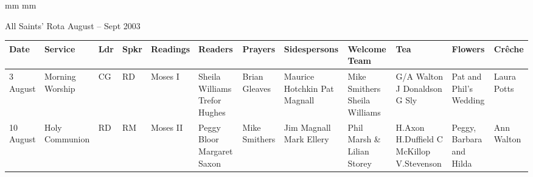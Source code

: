 \documentclass[10pt,a4paper]{article}
\newif\ifpdf
\begin{document}
\ifx\pdfoutput\undefined
\else
{} mm %
 mm
\fi
\begingroup
\ifpdf
\else
{}
\fi
\endgroup
\thispagestyle{empty}
\begin{center}
{\Large 
All Saints' Rota August -- Sept 2003}%
\vspace{1em}
{ \small
\begin{tabular}{|p{1.5cm}|p{1.8cm}|p{0.5cm}|p{0.5cm}|p{2.6cm}|p{2cm}|p{1.5cm}|p{2.4cm}|p{2.0cm}|p{2.2cm}
|p{1.8cm}|p{1.6cm}|}\hline
Date & Service
& Ldr & Spkr & Readings & Readers & Prayers &
Sidespersons & Welcome Team & Tea & Flowers & Cr\^{e}che \\ %
\hline\hline
3 August   &  Morning Worship & CG  & RD &   
 Moses I
& 
Sheila Williams  Trefor Hughes & Brian Gleaves &
 Maurice Hotchkin \linebreak Pat Magnall  & Mike Smithers Sheila Williams & 
G/A Walton  \linebreak J Donaldson  \linebreak G Sly
& Pat and Phil's Wedding  &  Laura Potts  \\ \hline %
 10 August  & Holy \linebreak Communion & RD  & RM & 
 Moses II
 & Peggy Bloor \linebreak  Margaret Saxon & Mike Smithers &
Jim Magnall Mark Ellery &  Phil Marsh \& Lilian Storey   & 
 H.Axon  \linebreak H.Duffield   C McKillop    V.Stevenson
& Peggy, Barbara and Hilda  &  Ann Walton    \\ \hline

\end{tabular}}
\end{center}
\end{document}
